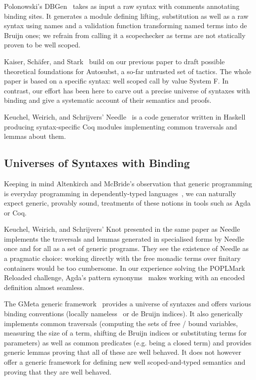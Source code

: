 Polonowski's DBGen~\citeyear{polonowski:db} takes as input a raw syntax with
comments annotating binding sites. It generates a module defining lifting,
substitution as well as a raw syntax using names and a validation function
transforming named terms into de Bruijn ones; we refrain from calling it a
scopechecker as terms are not statically proven to be well scoped.

Kaiser, Schäfer, and Stark~\citeyear{Kaiser-wsdebr} build on our previous paper
to draft possible theoretical foundations for Autosubst, a so-far untrusted
set of tactics. The whole paper is based on a specific syntax: well scoped
call by value System F. In contrast, our effort has been here to carve out
a precise universe of syntaxes with binding and give a systematic account
of their semantics and proofs.

Keuchel, Weirich, and Schrijvers' Needle~\citeyear{needleandknot} is a code
generator written in Haskell producing syntax-specific Coq modules
implementing common traversals and lemmas about them.

\subsection{Universes of Syntaxes with Binding} Keeping in mind Altenkirch
and McBride's observation that generic programming is everyday programming
in dependently-typed languages~\citeyear{genericprogramming-dtp}, we can naturally
expect generic, provably sound, treatments of these notions in tools such as
Agda or Coq.

Keuchel, Weirich, and Schrijvers' Knot presented in the same paper as
Needle~\citeyear{needleandknot} implements the traversals and lemmas generated
in specialised forms by Needle once and for all as a set of generic programs.
They see the existence of Needle as a pragmatic choice: working directly with
the free monadic terms over finitary containers would be too cumbersome. In
our experience solving the POPLMark Reloaded challenge, Agda's pattern
synonyms~\cite{Pickering:patsyn} makes working with an encoded definition almost
seamless.

The GMeta generic framework~\citeyear{gmeta} provides a universe of syntaxes
and offers various binding conventions (locally nameless~\cite{Chargueraud2012}
or de Bruijn indices). It also generically implements common traversals (computing
the sets of free / bound variables, measuring the size of a term, shifting
de Bruijn indices or substituting terms for parameters) as well as common
predicates (e.g. being a closed term) and provides generic lemmas proving that
all of these are well behaved. It does not however offer a generic framework
for defining new well scoped-and-typed semantics and proving that they are
well behaved.

